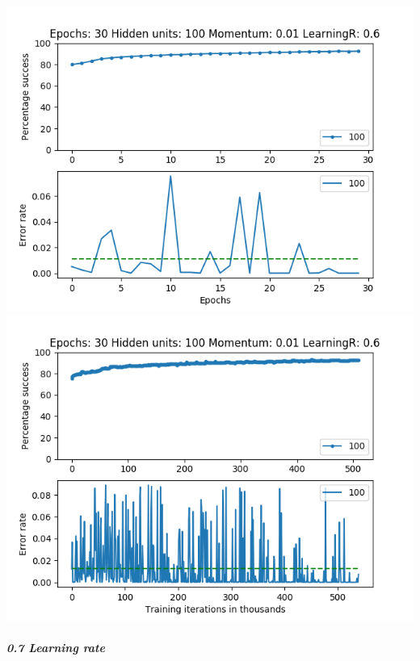 \documentclass[11pt]{article}
\makeatletter
\def\maxwidth{\ifdim\Gin@nat@width>\linewidth\linewidth
    \else\Gin@nat@width\fi}
\let\Oldincludegraphics\includegraphics
\renewcommand{\includegraphics}[1]{\Oldincludegraphics[width=.8\maxwidth]{#1}}
\makeatother
\begin{document}
\includegraphics{Experiment2/E2_NN_Epoch_Momentum_0.01_30Epochs_100_LR_0.6_Hiddenunits.png}
\includegraphics{Experiment2/E2_NN_Training_Momentum_0.01_30Epochs_100_LR_0.6_Hiddenunits.png}

\hypertarget{learning-rate-7}{%
\subparagraph{0.7 Learning rate}\label{learning-rate-7}}
\end{document}
